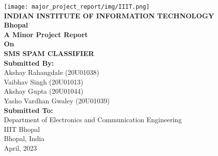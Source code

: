 
\thispagestyle{empty} %


\begin{titlepage}
{
	\thispagestyle{empty}
	\centering
	\normalsize
	  
	\texttt{[image: major\_project\_report/img/IIIT.png]}\\
	\textbf{INDIAN INSTITUTE OF INFORMATION TECHNOLOGY}\\
	\textbf{Bhopal}
	\\[2cm]
	
	{\bf A Minor Project Report }\\
	{\bf On } \\ 
	{\bf SMS SPAM CLASSIFIER } \\[2.5cm]
	
	
	{\bf Submitted By:} \\
	Akshay Rahangdale \hspace{1cm}(20U01038)\\
	Vaibhav Singh \hspace{1cm}(20U01013)\\
	Akshay Gupta \hspace{1cm}(20U01044)\\
	Yasho Vardhan Gwaley \hspace{1cm}(20U01039)\\ [1.5cm]
	
    
    {\bf Submitted To: } \\
	Department of Electronics and Communication Engineering \\
	IIIT Bhopal \\
	Bhopal, India \\ [1.5cm]
 
	April, 2023
	
}
\end{titlepage}

